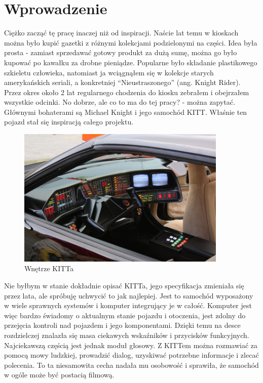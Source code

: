 \documentclass[declaration,shortabstract, inz]{iithesis}
\author         {Michał Postawka}
\begin{document}

\chapter{Wprowadzenie}

Ciężko zacząć tę pracę inaczej niż od inspiracji. Naście lat temu w kioskach można było kupić gazetki z różnymi kolekcjami podzielonymi na części. Idea była prosta - zamiast sprzedawać gotowy produkt za dużą sumę, można go było kupować po kawałku za drobne pieniądze. Popularne było składanie plastikowego szkieletu człowieka, natomiast ja wciągnąłem się w kolekcje starych amerykańskich seriali, a konkretniej  ``Nieustraszonego'' (ang. Knight Rider). Przez okres około 2 lat regularnego chodzenia do kiosku zebrałem i obejrzałem wszystkie odcinki.
No dobrze, ale co to ma do tej pracy? - można zapytać. Głównymi bohaterami są Michael Knight i jego samochód KITT. Właśnie ten pojazd stał się inspiracją całego projektu.

\begin{figure}[htp]
    \centering
    \includegraphics[width=10cm]{images/kitt_interior.jpg}
    \caption{Wnętrze KITTa}
    \label{fig:kitt}
\end{figure}

Nie byłbym w stanie dokładnie opisać KITTa, jego specyfikacja zmieniała się przez lata, ale spróbuję uchwycić to jak najlepiej. Jest to samochód wyposażony w wiele sprawnych systemów i komputer integrujący je w całość. Komputer jest więc bardzo świadomy o aktualnym stanie pojazdu i otoczenia, jest zdolny do przejęcia kontroli nad pojazdem i jego komponentami. Dzięki temu na desce rozdzielczej znalazła się masa ciekawych wskaźników i przycisków funkcyjnych. Najciekawszą częścią jest jednak moduł głosowy. Z KITTem można rozmawiać za pomocą mowy ludzkiej, prowadzić dialog, uzyskiwać potrzebne informacje i zlecać polecenia. To ta niesamowita cecha nadała mu osobowość i sprawiła, że samochód w ogóle może być postacią filmową.
\end{document}
